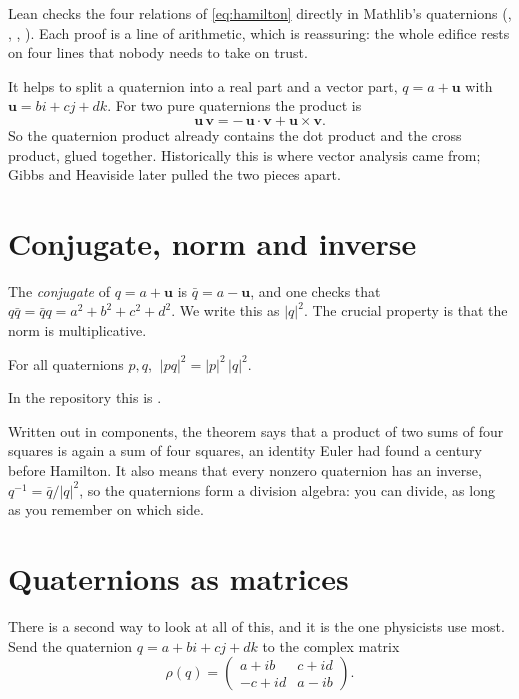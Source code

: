Lean checks the four relations of \eqref{eq:hamilton} directly in Mathlib's quaternions (, , , ). Each proof is a line of arithmetic, which is reassuring: the whole edifice rests on four lines that nobody needs to take on trust.

It helps to split a quaternion into a real part and a vector part, $q=a+\mathbf u$ with $\mathbf u=bi+cj+dk$. For two pure quaternions the product is
\begin{equation}\label{eq:dotcross}
\mathbf u\,\mathbf v=-\,\mathbf u\cdot\mathbf v+\mathbf u\times\mathbf v .
\end{equation}
So the quaternion product already contains the dot product and the cross product, glued together. Historically this is where vector analysis came from; Gibbs and Heaviside later pulled the two pieces apart.

\section{Conjugate, norm and inverse}

The \emph{conjugate} of $q=a+\mathbf u$ is $\bar q=a-\mathbf u$, and one checks that $q\bar q=\bar qq=a^2+b^2+c^2+d^2$. We write this as $|q|^2$. The crucial property is that the norm is multiplicative.

\begin{theorem}\proved
For all quaternions $p,q$, $\ |pq|^2=|p|^2\,|q|^2$.
\end{theorem}
\noindent In the repository this is .

Written out in components, the theorem says that a product of two sums of four squares is again a sum of four squares, an identity Euler had found a century before Hamilton. It also means that every nonzero quaternion has an inverse, $q^{-1}=\bar q/|q|^2$, so the quaternions form a division algebra: you can divide, as long as you remember on which side.

\section{Quaternions as matrices}

There is a second way to look at all of this, and it is the one physicists use most. Send the quaternion $q=a+bi+cj+dk$ to the complex matrix
\begin{equation}\label{eq:rho}
\rho(q)=\begin{pmatrix} a+ib & c+id\\ -c+id & a-ib\end{pmatrix}.
\end{equation}

